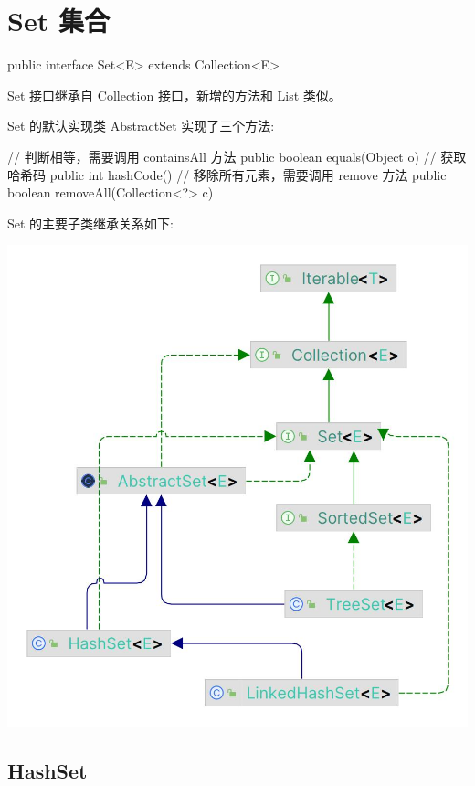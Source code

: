 \section{Set 集合}

\begin{Java}
public interface Set<E> extends Collection<E>
\end{Java}

Set 接口继承自 Collection 接口，新增的方法和 List 类似。

Set 的默认实现类 AbstractSet 实现了三个方法:

\begin{Java}
// 判断相等，需要调用 containsAll 方法
public boolean equals(Object o)
// 获取哈希码
public int hashCode()
// 移除所有元素，需要调用 remove 方法
public boolean removeAll(Collection<?> c)
\end{Java}

Set 的主要子类继承关系如下:

\begin{center}
    \includegraphics[width=0.5\linewidth]{../../../imgs/Set.jpg}
\end{center}

\subsection{HashSet}